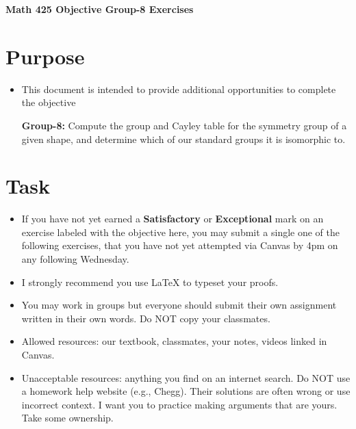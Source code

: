 \documentclass[12pt]{article}
\begin{document}
	\begin{center}
		{\Large \bf Math 425 Objective Group-8 Exercises}
	\end{center}
	\section*{Purpose}
	\begin{itemize}
		\item This document is intended to provide additional opportunities to complete the objective
		
		\textbf{Group-8:} Compute the group and Cayley table for the symmetry group of a given shape, and determine which of our standard groups it is isomorphic to.
	\end{itemize}
	\section*{Task}
	\begin{itemize}
		\item If you have not yet earned a \textbf{Satisfactory} or \textbf{Exceptional} mark on an exercise labeled with the objective here, you may submit a single one of the following exercises, that you have not yet attempted via Canvas by 4pm on any following Wednesday.
		\item I strongly recommend you use LaTeX to typeset your proofs.
		\item You may work in groups but everyone should submit their own assignment written in their own words.  Do NOT copy your classmates.
		\item Allowed resources: our textbook, classmates, your notes, videos linked in Canvas.
		\item Unacceptable resources: anything you find on an internet search. Do NOT use a homework help website (e.g., Chegg). Their solutions are often wrong or use incorrect context.  I want you to practice making arguments that are yours. Take some ownership.
	\end{itemize}
\end{document}
